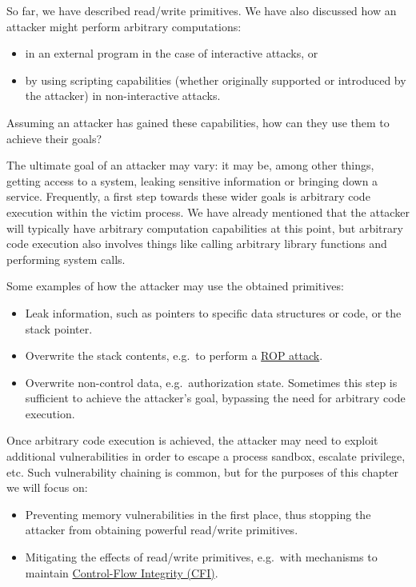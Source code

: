 \documentclass[
  a4paper,
]{report}
\providecommand{\tightlist}{%
  \setlength{\itemsep}{0pt}\setlength{\parskip}{0pt}}
\begin{document}
So far, we have described read/write primitives. We have also discussed
how an attacker might perform arbitrary computations:

\begin{itemize}
\tightlist
\item
  in an external program in the case of interactive attacks, or
\item
  by using scripting capabilities (whether originally supported or
  introduced by the attacker) in non-interactive attacks.
\end{itemize}

Assuming an attacker has gained these capabilities, how can they use
them to achieve their goals?

The ultimate goal of an attacker may vary: it may be, among other
things, getting access to a system, leaking sensitive information or
bringing down a service. Frequently, a first step towards these wider
goals is \label{__index_entry_10}{arbitrary code
execution} within the victim process. We
have already mentioned that the attacker will typically have arbitrary
computation capabilities at this point, but arbitrary code execution
also involves things like calling arbitrary library functions and
performing system calls.

Some examples of how the attacker may use the obtained primitives:

\begin{itemize}
\tightlist
\item
  Leak information, such as pointers to specific data structures or
  code, or the stack pointer.
\item
  Overwrite the stack contents, e.g.~to perform a \hyperref[rop]{ROP
  attack}.
\item
  Overwrite non-control data, e.g.~authorization state. Sometimes this
  step is sufficient to achieve the attacker's goal, bypassing the need
  for arbitrary code execution.
\end{itemize}

Once arbitrary code execution is achieved, the attacker may need to
exploit additional vulnerabilities in order to escape a process sandbox,
escalate privilege, etc. Such vulnerability chaining is common, but for
the purposes of this chapter we will focus on:

\begin{itemize}
\tightlist
\item
  Preventing memory vulnerabilities in the first place, thus stopping
  the attacker from obtaining powerful read/write primitives.
\item
  Mitigating the effects of read/write primitives, e.g.~with mechanisms
  to maintain \hyperref[control-flow-integrity-cfi]{Control-Flow
  Integrity (CFI)}.
\end{itemize}
\end{document}
